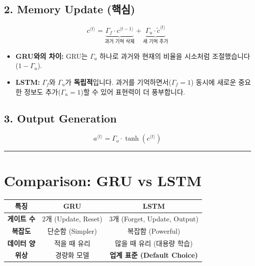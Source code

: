 \documentclass[11pt,a4paper]{book}
\theoremstyle{definition}
\begin{document}
\subsection{2. Memory Update (핵심)}
\begin{formulabox}[title={Cell State Update}]
$$ c^{\langle t \rangle} = \underbrace{\Gamma_f \cdot c^{\langle t-1 \rangle}}_{\text{과거 기억 삭제}} + \underbrace{\Gamma_u \cdot \tilde{c}^{\langle t \rangle}}_{\text{새 기억 추가}} $$
\begin{itemize}
    \item \textbf{GRU와의 차이:} GRU는 $\Gamma_u$ 하나로 과거와 현재의 비율을 시소처럼 조절했습니다 ($1-\Gamma_u$).
    \item \textbf{LSTM:} $\Gamma_f$와 $\Gamma_u$가 \textbf{독립적}입니다. 과거를 기억하면서($\Gamma_f=1$) 동시에 새로운 중요한 정보도 추가($\Gamma_u=1$)할 수 있어 표현력이 더 풍부합니다.
\end{itemize}
\end{formulabox}

\subsection{3. Output Generation}
$$ a^{\langle t \rangle} = \Gamma_o \cdot \tanh(c^{\langle t \rangle}) $$

\vspace{0.5cm}\hrule\vspace{0.5cm}

\section{Comparison: GRU vs LSTM}

\begin{center}
\begin{tabular}{|c|c|c|}
\hline
\textbf{특징} & \textbf{GRU} & \textbf{LSTM} \\ \hline
\textbf{게이트 수} & 2개 (Update, Reset) & 3개 (Forget, Update, Output) \\ \hline
\textbf{복잡도} & 단순함 (Simpler) & 복잡함 (Powerful) \\ \hline
\textbf{데이터 양} & 적을 때 유리 & 많을 때 유리 (대용량 학습) \\ \hline
\textbf{위상} & 경량화 모델 & \textbf{업계 표준 (Default Choice)} \\ \hline
\end{tabular}
\end{center}

\end{document}
